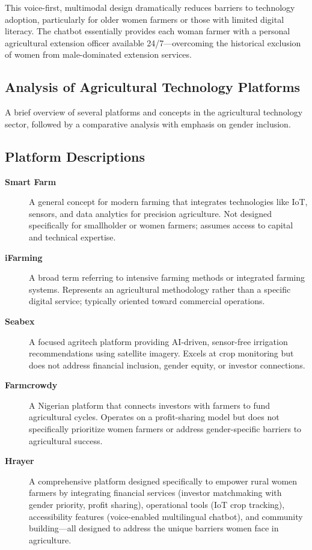 \documentclass[9pt,twocolumn,twoside]{article}
\begin{document}
This voice-first, multimodal design dramatically reduces barriers to technology adoption, particularly for older women farmers or those with limited digital literacy. The chatbot essentially provides each woman farmer with a personal agricultural extension officer available 24/7—overcoming the historical exclusion of women from male-dominated extension services.

\newpage
\subsection{Analysis of Agricultural Technology Platforms}

A brief overview of several platforms and concepts in the agricultural technology sector, followed by a comparative analysis with emphasis on gender inclusion.

\subsection*{Platform Descriptions}
\begin{description}
    \item[\textbf{Smart Farm}] A general concept for modern farming that integrates technologies like IoT, sensors, and data analytics for precision agriculture. Not designed specifically for smallholder or women farmers; assumes access to capital and technical expertise.

    \item[\textbf{iFarming}] A broad term referring to intensive farming methods or integrated farming systems. Represents an agricultural methodology rather than a specific digital service; typically oriented toward commercial operations.

    \item[\textbf{Seabex}] A focused agritech platform providing AI-driven, sensor-free irrigation recommendations using satellite imagery. Excels at crop monitoring but does not address financial inclusion, gender equity, or investor connections.

    \item[\textbf{Farmcrowdy}] A Nigerian platform that connects investors with farmers to fund agricultural cycles. Operates on a profit-sharing model but does not specifically prioritize women farmers or address gender-specific barriers to agricultural success.

    \item[\textbf{Hrayer}] A comprehensive platform designed specifically to empower rural women farmers by integrating financial services (investor matchmaking with gender priority, profit sharing), operational tools (IoT crop tracking), accessibility features (voice-enabled multilingual chatbot), and community building—all designed to address the unique barriers women face in agriculture.
\end{description}
\end{document}
